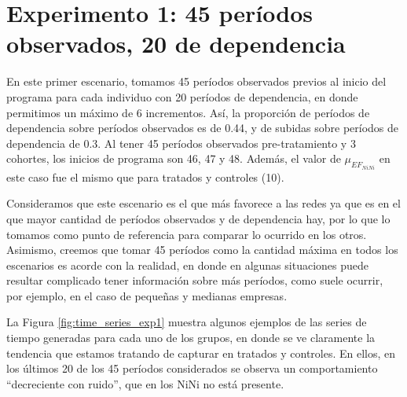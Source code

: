 \documentclass[../../main.tex]{subfiles}
\begin{document}
\section{Experimento 1: 45 períodos observados, 20 de dependencia} \label{sec:exp1}
En este primer escenario, tomamos 45 períodos observados previos al inicio del programa
para cada individuo con 20 períodos de dependencia, en donde permitimos un máximo de 6
incrementos. Así, la proporción de períodos de dependencia sobre períodos observados es de
0.44, y de subidas sobre períodos de dependencia de 0.3. Al tener 45 períodos observados
pre-tratamiento y 3 cohortes, los inicios de programa son 46, 47 y 48. Además, el valor
de \(\mu_{{EF}_{NiNi}}\) en este caso fue el mismo que para tratados y controles (10).


Consideramos que este escenario es el que más favorece a las redes ya que es en el que
mayor cantidad de períodos observados y de dependencia hay, por lo que lo tomamos como
punto de referencia para comparar lo ocurrido en los otros. Asimismo, creemos que tomar 45
períodos como la cantidad máxima en todos los escenarios es acorde con la realidad, en
donde en algunas situaciones puede resultar complicado tener información sobre más
períodos, como suele ocurrir, por ejemplo, en el caso de pequeñas y medianas empresas.

La Figura \ref{fig:time_series_exp1} muestra algunos ejemplos de las series de tiempo
generadas para cada uno de los grupos, en donde se ve claramente la tendencia que estamos
tratando de capturar en tratados y controles. En ellos, en los últimos 20 de los 45
períodos considerados se observa un comportamiento ``decreciente con ruido'', que en los
NiNi no está presente.
\end{document}
